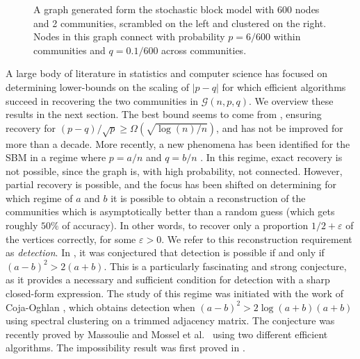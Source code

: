 \documentclass[english]{article}
\newcommand{\eps}{\varepsilon}
\newcommand{\1}{\textbf{1}}
\begin{document}
\begin{figure}[h]
\begin{subfigure}{.5\textwidth}
\end{subfigure}
\caption{A graph generated form the stochastic block model with 600 nodes and 2 communities, scrambled on the left and clustered on the right. Nodes in this graph connect with probability $p=6/600$ within communities and $q=0.1/600$ across communities. 
}
\label{cluster-plot}
\end{figure}





A large body of literature in statistics and computer science \cite{bui,dyer,boppana,snij,jerrum,condon,carson,mcsherry,bickel,rohe,choi} has focused on determining lower-bounds on the scaling of $|p-q|$ for which efficient algorithms succeed in recovering the two communities in $\mathcal{G}(n,p,q)$.  
We overview these results in the next section. The best bound seems to come from \cite{mcsherry}, ensuring recovery for $(p - q)/\sqrt{p} \geq \Omega (\sqrt{\log(n)/n })$, and has not be improved for more than a decade. More recently, a new phenomena has been identified for the SBM in a regime where $p=a/n$ and $q=b/n$ \cite{decelle}. In this regime, exact recovery is not possible, since the graph is, with high probability, not connected.
However, partial recovery is possible, and the focus has been shifted on determining for which regime of $a$ and $b$ it is possible to obtain a reconstruction of the communities which is asymptotically better than a random guess (which gets roughly $50\%$ of accuracy). In other words, to recover only a proportion $1/2 + \eps$ of the vertices correctly, for some $\eps >0$. We refer to this reconstruction requirement as {\it detection}. In \cite{decelle}, it was conjectured that detection is possible if and only if $(a-b)^2> 2 (a+b)$. This is a particularly fascinating and strong conjecture, as it provides a necessary and sufficient condition for detection with a sharp closed-form expression. The study of this regime was initiated with the work of Coja-Oghlan \cite{coja-sbm}, which obtains detection when $(a-b)^2> 2 \log(a+b) (a+b)$ using spectral clustering on a trimmed adjacency matrix. 
The conjecture was recently proved by Massoulie \cite{Massoulie_SBM} and Mossel et al.\ \cite{Mossel_SBM2} using two different efficient algorithms. The impossibility result was first proved in \cite{Mossel_SBM1}.
\end{document}
